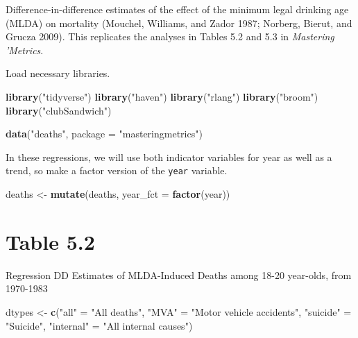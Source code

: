 \documentclass[]{book}
\newenvironment{Shaded}{\begin{snugshade}}{\end{snugshade}}
\newcommand{\DataTypeTok}[1]{\textcolor[rgb]{0.13,0.29,0.53}{#1}}
\newcommand{\KeywordTok}[1]{\textcolor[rgb]{0.13,0.29,0.53}{\textbf{#1}}}
\newcommand{\NormalTok}[1]{#1}
\newcommand{\StringTok}[1]{\textcolor[rgb]{0.31,0.60,0.02}{#1}}
\theoremstyle{definition}
\theoremstyle{definition}
\theoremstyle{definition}
\theoremstyle{remark}
\begin{document}
Difference-in-difference estimates of the effect of the minimum legal
drinking age (MLDA) on mortality (Mouchel, Williams, and Zador 1987;
Norberg, Bierut, and Grucza 2009). This replicates the analyses in
Tables 5.2 and 5.3 in \emph{Mastering 'Metrics}.

Load necessary libraries.

\begin{Shaded}
\begin{Highlighting}[]
\KeywordTok{library}\NormalTok{(}\StringTok{"tidyverse"}\NormalTok{)}
\KeywordTok{library}\NormalTok{(}\StringTok{"haven"}\NormalTok{)}
\KeywordTok{library}\NormalTok{(}\StringTok{"rlang"}\NormalTok{)}
\KeywordTok{library}\NormalTok{(}\StringTok{"broom"}\NormalTok{)}
\KeywordTok{library}\NormalTok{(}\StringTok{"clubSandwich"}\NormalTok{)}
\end{Highlighting}
\end{Shaded}

\begin{Shaded}
\begin{Highlighting}[]
\KeywordTok{data}\NormalTok{(}\StringTok{"deaths"}\NormalTok{, }\DataTypeTok{package =} \StringTok{"masteringmetrics"}\NormalTok{)}
\end{Highlighting}
\end{Shaded}

In these regressions, we will use both indicator variables for year as
well as a trend, so make a factor version of the \texttt{year} variable.

\begin{Shaded}
\begin{Highlighting}[]
\NormalTok{deaths <-}\StringTok{ }\KeywordTok{mutate}\NormalTok{(deaths, }\DataTypeTok{year_fct =} \KeywordTok{factor}\NormalTok{(year))}
\end{Highlighting}
\end{Shaded}

\hypertarget{table-5.2}{%
\section{Table 5.2}\label{table-5.2}}

Regression DD Estimates of MLDA-Induced Deaths among 18-20 year-olds,
from 1970-1983

\begin{Shaded}
\begin{Highlighting}[]
\NormalTok{dtypes <-}\StringTok{ }\KeywordTok{c}\NormalTok{(}\StringTok{"all"}\NormalTok{ =}\StringTok{ "All deaths"}\NormalTok{,}
            \StringTok{"MVA"}\NormalTok{ =}\StringTok{ "Motor vehicle accidents"}\NormalTok{,}
            \StringTok{"suicide"}\NormalTok{ =}\StringTok{ "Suicide"}\NormalTok{,}
            \StringTok{"internal"}\NormalTok{ =}\StringTok{ "All internal causes"}\NormalTok{)}
\end{Highlighting}
\end{Shaded}
\end{document}
